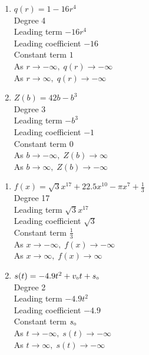 \begin{multicols}{2}
\begin{enumerate}
\setcounter{enumi}{\value{HW}}

\item $q(r) = 1 - 16r^{4}$\\
Degree 4 \\
Leading term $-16r^{4}$\\
Leading coefficient $-16$\\
Constant term $1$\\
As $r \rightarrow -\infty, \; q(r) \rightarrow -\infty$\\
As $r \rightarrow \infty, \; q(r) \rightarrow -\infty$\\

\item $Z(b) = 42b - b^{3}$\\
Degree 3 \\
Leading term $-b^{3}$\\
Leading coefficient $-1$\\
Constant term $0$\\
As $b \rightarrow -\infty, \; Z(b) \rightarrow \infty$\\
As $b \rightarrow \infty, \; Z(b) \rightarrow -\infty$\\

\setcounter{HW}{\value{enumi}}
\end{enumerate}
\end{multicols}

\begin{multicols}{2}
\begin{enumerate}
\setcounter{enumi}{\value{HW}}

\item $f(x) = \sqrt{3}x^{17} + 22.5x^{10} - \pi x^{7} + \frac{1}{3}$\\
Degree 17 \\
Leading term $\sqrt{3}x^{17}$\\
Leading coefficient $\sqrt{3}$\\
Constant term $\frac{1}{3}$\\
As $x \rightarrow -\infty, \; f(x) \rightarrow -\infty$\\
As $x \rightarrow \infty, \; f(x) \rightarrow \infty$\\


\item $s(t) = -4.9t^{2} + v_{\mbox{\tiny $0$}}t + s_{\mbox{\tiny $0$}}$\\
Degree 2 \\
Leading term $-4.9t^{2}$\\
Leading coefficient $-4.9$\\
Constant term $s_{\mbox{\tiny $0$}}$\\
As $t \rightarrow -\infty, \; s(t) \rightarrow -\infty$\\
As $t \rightarrow \infty, \; s(t) \rightarrow -\infty$\\


\setcounter{HW}{\value{enumi}}
\end{enumerate}
\end{multicols}


